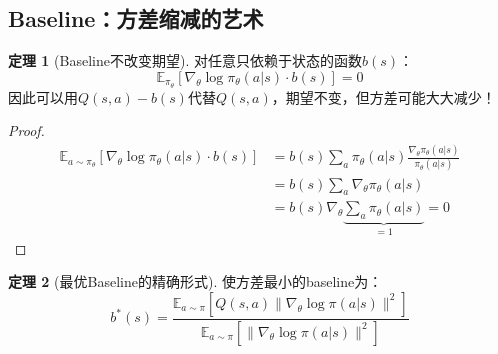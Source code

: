 \documentclass[11pt,a4paper]{article}
\theoremstyle{definition}
\newtheorem{theorem}{定理}[section]
\begin{document}
\subsection{Baseline：方差缩减的艺术}

\begin{theorem}[Baseline不改变期望]
对任意只依赖于状态的函数$b(s)$：
\[
\mathbb{E}_{\pi_\theta}[\nabla_\theta \log \pi_\theta(a|s) \cdot b(s)] = 0
\]
因此可以用$Q(s,a) - b(s)$代替$Q(s,a)$，期望不变，但方差可能大大减少！
\end{theorem}

\begin{proof}
\begin{align*}
\mathbb{E}_{a \sim \pi_\theta}[\nabla_\theta \log \pi_\theta(a|s) \cdot b(s)] &= b(s) \sum_a \pi_\theta(a|s) \frac{\nabla_\theta \pi_\theta(a|s)}{\pi_\theta(a|s)} \\
&= b(s) \sum_a \nabla_\theta \pi_\theta(a|s) \\
&= b(s) \nabla_\theta \underbrace{\sum_a \pi_\theta(a|s)}_{=1} = 0
\end{align*}
\end{proof}

\begin{theorem}[最优Baseline的精确形式]
使方差最小的baseline为：
\[
b^*(s) = \frac{\mathbb{E}_{a \sim \pi}[Q(s,a) \|\nabla_\theta \log \pi(a|s)\|^2]}{\mathbb{E}_{a \sim \pi}[\|\nabla_\theta \log \pi(a|s)\|^2]}
\]
\end{theorem}
\end{document}
